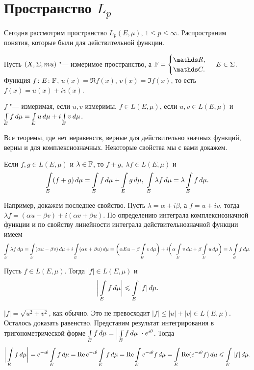 \section{Пространство $L_p$}
Сегодня рассмотрим пространство $L_p(E,\mu)$, $1\le p\le \infty$. Распространим понятия, которые были для действительной функции.

Пусть $(X,\Sigma,mu)$ "--- измеримое пространство, а $\F = \begin{cases}\R,\\\C.\end{cases}$ $E\in\Sigma$. Функция $f\colon E\colon \mathbb F$, $u(x)=\Re f(x)$, $v(x) = \Im f(x)$, то есть $f(x) = u(x)+i v(x)$.
\begin{Def}
  $f$ "--- измеримая, если $u,v$ измеримы. $f\in L(E,\mu)$, если $u,v\in L(E,\mu)$ и $\int\limits_{E}f\,d\mu = \int\limits_{E}u\,d\mu + i\int\limits_{E}v\,d\mu$.
\end{Def}

Все теоремы, где нет неравенств, верные для действительно значных функций, верны и для комплекснозначных. Некоторые свойства мы с вами докажем.
\begin{Ut}
  Если $f,g\in L(E,\mu)$ и $\lambda\in\mathbb F$, то $f+g,\ \lambda f\in L(E,\mu)$ и 
 \[
  \int\limits_{E}(f+g)\,d\mu = \int\limits_{E}f\,d\mu+\int\limits_{E}g\,d\mu,\ \int\limits_{E}\lambda f\,d\mu = \lambda\int\limits_{E}f\,d\mu.
\] 
\end{Ut}
\begin{Proof}
 Например, докажем последнее свойство. Пусть $\lambda = \alpha + i\beta$, а $f = u + i v$, тогда $\lambda f = (\alpha u - \beta v) + i (\alpha v + \beta u)$. По определению интеграла комплекснозначной функции и по свойству линейности интеграла действительнозначной функции имеем
\[
 \int\limits_{E}\lambda f\,d\mu = \int\limits_{E}(\alpha u - \beta v)\,d\mu + i\int\limits_{E}(\alpha v + \beta u)\,d\mu = \bigg(\alpha Eu - \beta\int\limits_{E}v\,d\mu\bigg) + i\bigg(\alpha\int\limits_{E}v\,d\mu + \beta \int\limits_{E}u\,d\mu\bigg) = \lambda \int\limits_{E}f\,d\mu.
\]
\end{Proof}

\begin{Ut}
  Пусть $f\in L(E,\mu)$. Тогда $|f|\in L(E,\mu)$ и
\[
  \bigg|\int\limits_{E}f\,d\mu\bigg|\leqslant \int\limits_{E}|f|\,d\mu.
\]
\end{Ut}

\begin{Proof}
  $|f| = \sqrt{u^2+v^2}$, как обычно. Это не превосходит $|f|\le |u|+|v|\in L(E,\mu)$. Осталось доказать равенство. Представим результат интегрирования в тригонометрической форме $\int\limits_{E}f\,d\mu = \Big|\int\limits_{E}f\,d\mu\Big|\cdot e^{i\theta}$. Тогда
\[
  \bigg|\int\limits_{E}f\,d\mu\bigg| = e^{-i\theta}\int\limits_{E}f\,d\mu = \mathop{\text{Re}} e^{-i\theta}\int\limits_{E}f\,d\mu = \mathop{\text{Re}}\int\limits_{E}e^{-i\theta}f\,d\mu = \int\limits_{E}\mathop{\text{Re}}(e^{-i\theta}f)\,d\mu\leqslant \int\limits_{E}|f|\,d\mu.
\]
\end{Proof}

